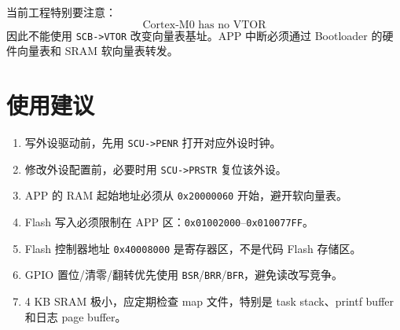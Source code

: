 \documentclass[UTF8,a4paper,11pt]{ctexart}
\newcommand{\addr}[1]{\texttt{#1}}
\newcommand{\reg}[1]{\texttt{#1}}
\begin{document}
当前工程特别要注意：
\[
  \text{Cortex-M0 has no VTOR}
\]
因此不能使用 \reg{SCB->VTOR} 改变向量表基址。APP 中断必须通过 Bootloader 的硬件向量表和 SRAM 软向量表转发。

\section{使用建议}

\begin{enumerate}
  \item 写外设驱动前，先用 \reg{SCU->PENR} 打开对应外设时钟。
  \item 修改外设配置前，必要时用 \reg{SCU->PRSTR} 复位该外设。
  \item APP 的 RAM 起始地址必须从 \addr{0x20000060} 开始，避开软向量表。
  \item Flash 写入必须限制在 APP 区：\addr{0x01002000}--\addr{0x010077FF}。
  \item Flash 控制器地址 \addr{0x40008000} 是寄存器区，不是代码 Flash 存储区。
  \item GPIO 置位/清零/翻转优先使用 \reg{BSR}/\reg{BRR}/\reg{BFR}，避免读改写竞争。
  \item 4 KB SRAM 极小，应定期检查 map 文件，特别是 task stack、printf buffer 和日志 page buffer。
\end{enumerate}
\end{document}
